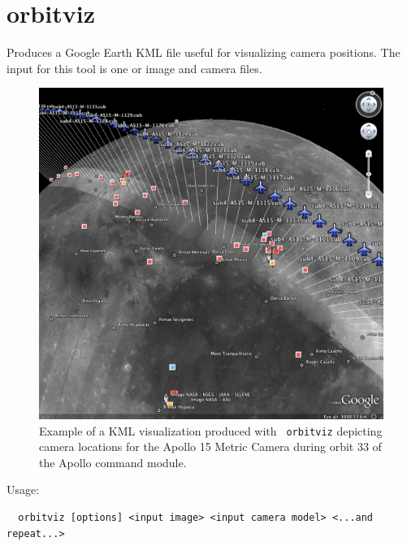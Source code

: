 \section{orbitviz}
\label{orbitviz}

Produces a Google Earth \ac{KML} file useful for visualizing camera
positions. The input for this tool is one or image and camera files.

\begin{figure}[!b]
  \begin{center}
  \includegraphics[width=6in]{images/orbitviz_ge_result_600px.png}
  \end{center}
  \caption{ Example of a \ac{KML} visualization produced with {\tt
      orbitviz} depicting camera locations for the Apollo 15 Metric
    Camera during orbit 33 of the Apollo command module.}
  \label{fig:orbitviz_example}
\end{figure}

Usage:
\begin{verbatim}
  orbitviz [options] <input image> <input camera model> <...and repeat...>
\end{verbatim}

